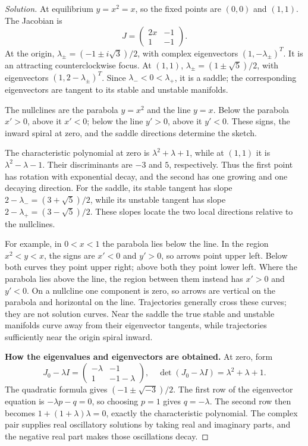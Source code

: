 \documentclass[10pt]{amsart}
\newenvironment{solution}
{\begin{proof}[Solution]}
{\end{proof}}
\begin{document}
\begin{enumerate}[label=\arabic*), leftmargin=*, itemsep=1em]
\begin{solution}
At equilibrium $y=x^2=x$, so the fixed points are $(0,0)$ and $(1,1)$. The Jacobian is
\[
J=\begin{pmatrix}2x&-1\\1&-1\end{pmatrix}.
\]
At the origin, $\lambda_\pm=(-1\pm i\sqrt3)/2$, with complex eigenvectors $(1,-\lambda_\pm)^T$. It is an attracting counterclockwise focus. At $(1,1)$, $\lambda_\pm=(1\pm\sqrt5)/2$, with eigenvectors $(1,2-\lambda_\pm)^T$. Since $\lambda_-<0<\lambda_+$, it is a saddle; the corresponding eigenvectors are tangent to its stable and unstable manifolds.

The nullclines are the parabola $y=x^2$ and the line $y=x$. Below the parabola $x'>0$, above it $x'<0$; below the line $y'>0$, above it $y'<0$. These signs, the inward spiral at zero, and the saddle directions determine the sketch.

The characteristic polynomial at zero is $\lambda^2+\lambda+1$, while at $(1,1)$ it is $\lambda^2-\lambda-1$. Their discriminants are $-3$ and $5$, respectively. Thus the first point has rotation with exponential decay, and the second has one growing and one decaying direction. For the saddle, its stable tangent has slope $2-\lambda_-=(3+\sqrt5)/2$, while its unstable tangent has slope $2-\lambda_+=(3-\sqrt5)/2$. These slopes locate the two local directions relative to the nullclines.

For example, in $0<x<1$ the parabola lies below the line. In the region $x^2<y<x$, the signs are $x'<0$ and $y'>0$, so arrows point upper left. Below both curves they point upper right; above both they point lower left. Where the parabola lies above the line, the region between them instead has $x'>0$ and $y'<0$. On a nullcline one component is zero, so arrows are vertical on the parabola and horizontal on the line. Trajectories generally cross these curves; they are not solution curves. Near the saddle the true stable and unstable manifolds curve away from their eigenvector tangents, while trajectories sufficiently near the origin spiral inward.


\medskip\noindent\textbf{How the eigenvalues and eigenvectors are obtained.}
At zero, form
\[
J_0-\lambda I=\begin{pmatrix}-\lambda&-1\\1&-1-\lambda\end{pmatrix},
\quad\det(J_0-\lambda I)=\lambda^2+\lambda+1.
\]
The quadratic formula gives $(-1\pm\sqrt{-3})/2$. The first row of the eigenvector equation is $-\lambda p-q=0$, so choosing $p=1$ gives $q=-\lambda$. The second row then becomes $1+(1+\lambda)\lambda=0$, exactly the characteristic polynomial. The complex pair supplies real oscillatory solutions by taking real and imaginary parts, and the negative real part makes those oscillations decay.


\end{solution}
\end{enumerate}
\end{document}
